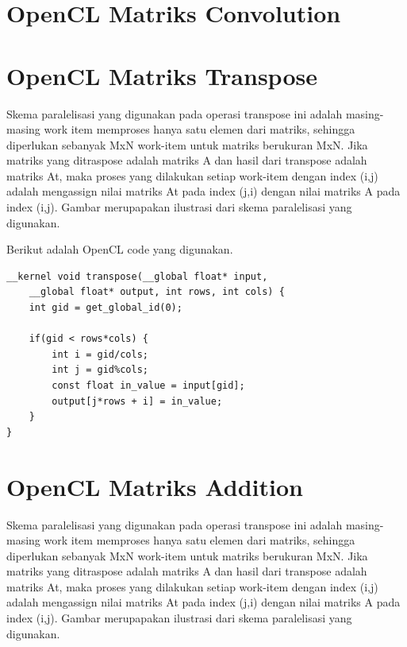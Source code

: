 \section{OpenCL Matriks Convolution}

\section{OpenCL Matriks Transpose}
Skema paralelisasi yang digunakan pada operasi transpose ini adalah masing-masing work item memproses hanya satu elemen dari matriks, sehingga diperlukan sebanyak MxN work-item untuk matriks berukuran MxN. Jika matriks yang ditraspose adalah matriks A dan hasil dari transpose adalah matriks At, maka proses yang dilakukan setiap work-item dengan index (i,j) adalah mengassign nilai matriks At pada index (j,i) dengan nilai matriks A pada index (i,j). Gambar merupapakan ilustrasi dari skema paralelisasi yang digunakan.

Berikut adalah OpenCL code yang digunakan.
\begin{lstlisting}[frame=single]
__kernel void transpose(__global float* input, 
    __global float* output, int rows, int cols) {         
    int gid = get_global_id(0);                                      

    if(gid < rows*cols) {                                                   
        int i = gid/cols;
        int j = gid%cols;  
        const float in_value = input[gid];
        output[j*rows + i] = in_value;
    }
}
\end{lstlisting}

\section{OpenCL Matriks Addition}
Skema paralelisasi yang digunakan pada operasi transpose ini adalah masing-masing work item memproses hanya satu elemen dari matriks, sehingga diperlukan sebanyak MxN work-item untuk matriks berukuran MxN. Jika matriks yang ditraspose adalah matriks A dan hasil dari transpose adalah matriks At, maka proses yang dilakukan setiap work-item dengan index (i,j) adalah mengassign nilai matriks At pada index (j,i) dengan nilai matriks A pada index (i,j). Gambar merupapakan ilustrasi dari skema paralelisasi yang digunakan.

